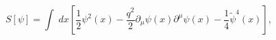 \begin{equation}
S[\psi]= \int\; dx\left[\frac12 \psi^2(x)
-\frac{q^2}{2}\partial_\mu \psi(x)\partial^\mu \psi(x) -
\frac14\tilde{\psi}^4(x) \right], \label{action-tab-x}
\end{equation}

